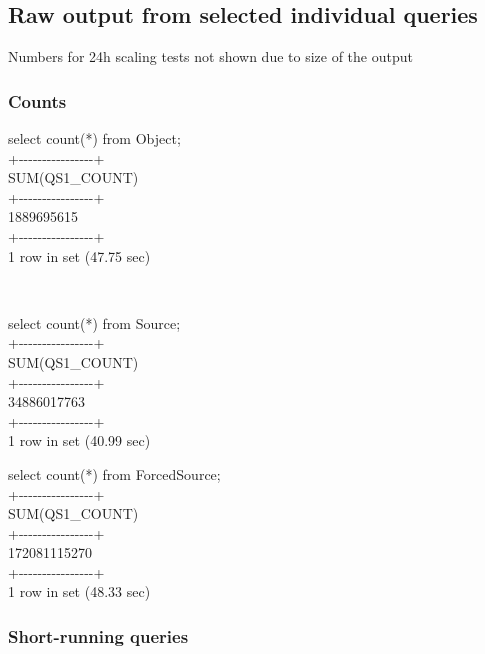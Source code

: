\subsection{Raw output from selected individual
queries}\label{raw-output-from-selected-individual-queries}

Numbers for 24h scaling tests not shown due to size of the output

\subsubsection{Counts}\label{counts}

select count(*) from Object;\\
+-\/-\/-\/-\/-\/-\/-\/-\/-\/-\/-\/-\/-\/-\/-\/-+\\
\textbar{} SUM(QS1\_COUNT) \textbar{}\\
+-\/-\/-\/-\/-\/-\/-\/-\/-\/-\/-\/-\/-\/-\/-\/-+\\
\textbar{} 1889695615 \textbar{}\\
+-\/-\/-\/-\/-\/-\/-\/-\/-\/-\/-\/-\/-\/-\/-\/-+\\
1 row in set (47.75 sec)

~

select count(*) from Source;\\
+-\/-\/-\/-\/-\/-\/-\/-\/-\/-\/-\/-\/-\/-\/-\/-+\\
\textbar{} SUM(QS1\_COUNT) \textbar{}\\
+-\/-\/-\/-\/-\/-\/-\/-\/-\/-\/-\/-\/-\/-\/-\/-+\\
\textbar{} 34886017763 \textbar{}\\
+-\/-\/-\/-\/-\/-\/-\/-\/-\/-\/-\/-\/-\/-\/-\/-+\\
1 row in set (40.99 sec)

select count(*) from ForcedSource;\\
+-\/-\/-\/-\/-\/-\/-\/-\/-\/-\/-\/-\/-\/-\/-\/-+\\
\textbar{} SUM(QS1\_COUNT) \textbar{}\\
+-\/-\/-\/-\/-\/-\/-\/-\/-\/-\/-\/-\/-\/-\/-\/-+\\
\textbar{} 172081115270 \textbar{}\\
+-\/-\/-\/-\/-\/-\/-\/-\/-\/-\/-\/-\/-\/-\/-\/-+\\
1 row in set (48.33 sec)

\subsubsection{Short-running queries}\label{short-running-queries}

